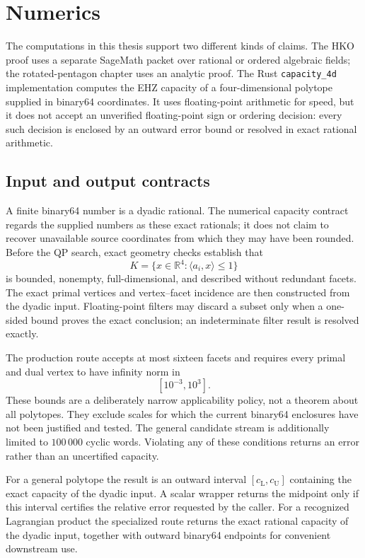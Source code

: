 \FloatBarrier
\section{Numerics}\label{sec:numerics}

The computations in this thesis support two different kinds of claims.
The HKO proof uses a separate SageMath packet over rational or ordered
algebraic fields; the rotated-pentagon chapter uses an analytic proof.  The
Rust \texttt{capacity\_4d} implementation computes the EHZ capacity of a
four-dimensional polytope supplied in binary64 coordinates.  It uses
floating-point arithmetic for speed, but it does not accept an unverified
floating-point sign or ordering decision: every such decision is enclosed by
an outward error bound or resolved in exact rational arithmetic.

\subsection{Input and output contracts}

A finite binary64 number is a dyadic rational.  The numerical capacity
contract regards the supplied numbers as these exact rationals; it does not
claim to recover unavailable source coordinates from which they may have been
rounded.  Before the QP search, exact geometry checks establish that
\[
  K=\{x\in\mathbb{R}^4:\langle a_i,x\rangle\leq1\}
\]
is bounded, nonempty, full-dimensional, and described without redundant
facets.  The exact primal vertices and vertex--facet incidence are then
constructed from the dyadic input.  Floating-point filters may discard a
subset only when a one-sided bound proves the exact conclusion; an
indeterminate filter result is resolved exactly.

The production route accepts at most sixteen facets and requires every primal
and dual vertex to have infinity norm in
\[
  [10^{-3},10^3].
\]
These bounds are a deliberately narrow applicability policy, not a theorem
about all polytopes.  They exclude scales for which the current binary64
enclosures have not been justified and tested.  The general candidate stream
is additionally limited to \(100\,000\) cyclic words.  Violating any of these
conditions returns an error rather than an uncertified capacity.

For a general polytope the result is an outward interval
\([c_{\mathrm L},c_{\mathrm U}]\) containing the exact capacity of the
dyadic input.  A scalar wrapper returns the midpoint only if this interval
certifies the relative error requested by the caller.  For a recognized
Lagrangian product the specialized route returns the exact rational capacity
of the dyadic input, together with outward binary64 endpoints for convenient
downstream use.

